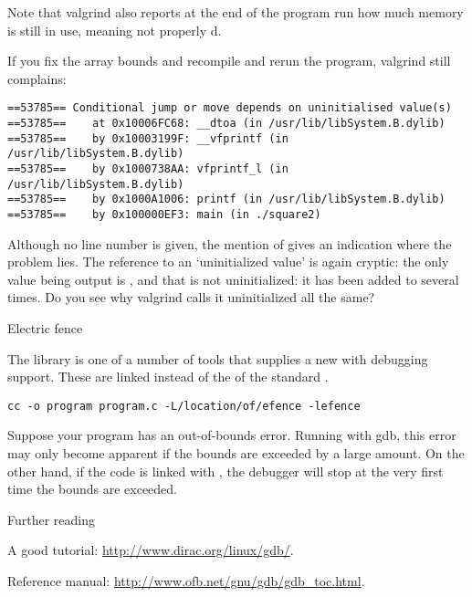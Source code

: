 Note that valgrind also reports at the end of the program run how much
memory is still in use, meaning not properly d.

If you fix the array bounds and recompile and rerun the program,
valgrind still complains:
{\small
\begin{verbatim}
==53785== Conditional jump or move depends on uninitialised value(s)
==53785==    at 0x10006FC68: __dtoa (in /usr/lib/libSystem.B.dylib)
==53785==    by 0x10003199F: __vfprintf (in /usr/lib/libSystem.B.dylib)
==53785==    by 0x1000738AA: vfprintf_l (in /usr/lib/libSystem.B.dylib)
==53785==    by 0x1000A1006: printf (in /usr/lib/libSystem.B.dylib)
==53785==    by 0x100000EF3: main (in ./square2)
\end{verbatim}
}
Although no line number is given, the mention of  gives an
indication where the problem lies.
The reference to an `uninitialized value' is again cryptic: the only
value being output is , and that is not uninitialized: it has
been added to several times. Do you see why valgrind calls it
uninitialized all the same?


 {Electric fence}

The  library is one of a number of tools
that supplies a new  with debugging support.
These are linked instead of the  of the standard
.

\begin{verbatim}
cc -o program program.c -L/location/of/efence -lefence
\end{verbatim}

Suppose your program has an out-of-bounds error. Running with gdb,
this error may only become apparent if the bounds are exceeded by a
large amount. On the other hand, if the code is linked with
, the debugger will stop at the very first time
the bounds are exceeded.

 {Further reading}

A good tutorial: \url{http://www.dirac.org/linux/gdb/}.

Reference manual: \url{http://www.ofb.net/gnu/gdb/gdb_toc.html}.


